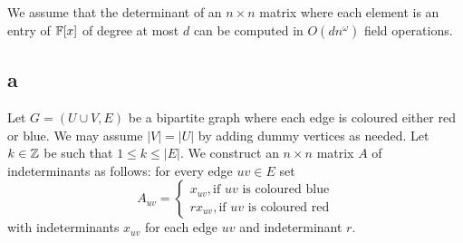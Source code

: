 \documentclass[letterpaper,12pt,oneside,onecolumn]{article}
\begin{document}
\section{}
\paragraph{}
We assume that the determinant of an $n \times n$ matrix where each element is an entry of $\mathbb{F}[x]$ of degree at most $d$ can be computed in $O(dn^\omega)$ field operations.
\subsection{a}
Let $G=(U\cup V, E)$ be a bipartite graph where each edge is coloured either red or blue. We may assume $|V| = |U|$ by adding dummy vertices as needed. Let $k \in \mathbb{Z}$ be such that $1 \leq k \leq |E|$. We construct an $n\times n$ matrix $A$ of indeterminants as follows: for every edge $uv \in E$ set
$$A_{uv} = \begin{cases}
x_{uv}, \text{if $uv$ is coloured blue} \\
rx_{uv}, \text{if $uv$ is coloured red}
\end{cases}$$
with indeterminants $x_{uv}$ for each edge $uv$ and indeterminant $r$.
\newpage
\section{}
\end{document}
